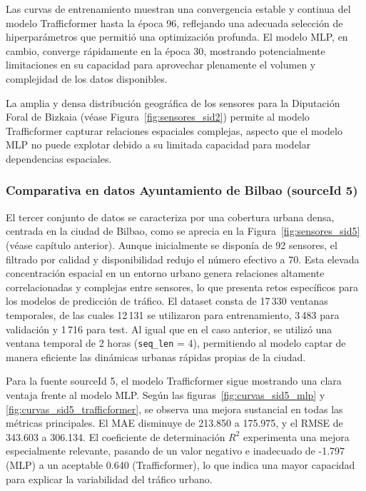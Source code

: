 Las curvas de entrenamiento muestran una convergencia estable y continua del modelo Trafficformer hasta la época 96, reflejando una adecuada selección de hiperparámetros que permitió una optimización profunda. El modelo MLP, en cambio, converge rápidamente en la época 30, mostrando potencialmente limitaciones en su capacidad para aprovechar plenamente el volumen y complejidad de los datos disponibles.

La amplia y densa distribución geográfica de los sensores para la Diputación Foral de Bizkaia (véase Figura~\ref{fig:sensores_sid2}) permite al modelo Trafficformer capturar relaciones espaciales complejas, aspecto que el modelo MLP no puede explotar debido a su limitada capacidad para modelar dependencias espaciales.

\subsubsection*{Comparativa en datos Ayuntamiento de Bilbao (sourceId 5)}

El tercer conjunto de datos se caracteriza por una cobertura urbana densa, centrada en la ciudad de Bilbao, como se aprecia en la Figura~\ref{fig:sensores_sid5} (véase capítulo anterior). Aunque inicialmente se disponía de 92 sensores, el filtrado por calidad y disponibilidad redujo el número efectivo a 70. Esta elevada concentración espacial en un entorno urbano genera relaciones altamente correlacionadas y complejas entre sensores, lo que presenta retos específicos para los modelos de predicción de tráfico. El dataset consta de 17\,330 ventanas temporales, de las cuales 12\,131 se utilizaron para entrenamiento, 3\,483 para validación y 1\,716 para test. Al igual que en el caso anterior, se utilizó una ventana temporal de 2 horas (\texttt{seq\_len} = 4), permitiendo al modelo captar de manera eficiente las dinámicas urbanas rápidas propias de la ciudad.

Para la fuente sourceId 5, el modelo Trafficformer sigue mostrando una clara ventaja frente al modelo MLP. Según las figuras~\ref{fig:curvas_sid5_mlp} y \ref{fig:curvas_sid5_trafficformer}, se observa una mejora sustancial en todas las métricas principales. El MAE disminuye de 213.850 a 175.975, y el RMSE de 343.603 a 306.134. El coeficiente de determinación $R^2$ experimenta una mejora especialmente relevante, pasando de un valor negativo e inadecuado de -1.797 (MLP) a un aceptable 0.640 (Trafficformer), lo que indica una mayor capacidad para explicar la variabilidad del tráfico urbano.

